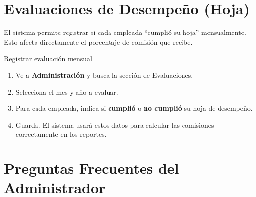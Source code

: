 \documentclass[12pt,a4paper]{article}
\begin{document}
\newpage
\section{Evaluaciones de Desempeño (Hoja)}

El sistema permite registrar si cada empleada ``cumplió su hoja'' mensualmente. Esto afecta directamente el porcentaje de comisión que recibe.

\begin{pasobox}{Registrar evaluación mensual}
\begin{enumerate}[leftmargin=*]
  \item Ve a \textbf{Administración} y busca la sección de Evaluaciones.
  \item Selecciona el mes y año a evaluar.
  \item Para cada empleada, indica si \textbf{cumplió} o \textbf{no cumplió} su hoja de desempeño.
  \item Guarda. El sistema usará estos datos para calcular las comisiones correctamente en los reportes.
\end{enumerate}
\end{pasobox}

\newpage
\section{Preguntas Frecuentes del Administrador}
\end{document}

